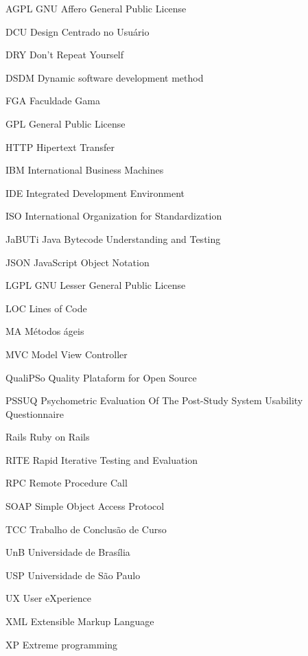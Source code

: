 \begin{siglas}

    	\item[AGPL] GNU Affero General Public License
	\item[DCU] Design Centrado no Usuário
	\item[DRY] Don't Repeat Yourself  	
  	\item[DSDM] Dynamic software development method  
	\item[FGA] Faculdade Gama
	\item[GPL] General Public License
	\item[HTTP] Hipertext Transfer	
	\item[IBM] International Business Machines
	\item[IDE] Integrated Development Environment
	\item[ISO] International Organization for Standardization  	
	\item[JaBUTi] Java Bytecode Understanding and Testing	
	\item[JSON] JavaScript Object Notation
	\item[LGPL] GNU Lesser General Public License
	\item[LOC] Lines of Code	
	\item[MA] Métodos ágeis
	\item[MVC] Model View Controller
	\item[QualiPSo] Quality Plataform for Open Source
	\item[PSSUQ] Psychometric Evaluation Of The Post-Study System Usability Questionnaire
	\item[Rails] Ruby on Rails	
	\item[RITE] Rapid Iterative Testing and Evaluation
	\item[RPC] Remote Procedure Call	
	\item[SOAP] Simple Object Access Protocol	
	\item[TCC] Trabalho de Conclusão de Curso					  
	\item[UnB] Universidade de Brasília
	\item[USP] Universidade de São Paulo	
	\item[UX] User eXperience
	\item[XML] Extensible Markup Language
	\item[XP] Extreme programming  
  
\end{siglas}
